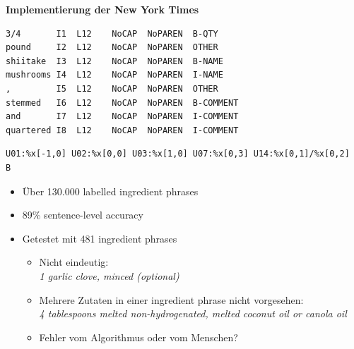 \documentclass[12pt]{beamer}
\begin{document}
\begin{frame}[fragile]
\begin{center}
		\textbf{Implementierung der New York Times}
\end{center}
\begin{lstlisting}[basicstyle=\small\ttfamily, frame=single, caption={Extract of the training data for New York Times CRF}]
3/4       I1  L12	 NoCAP	NoPAREN	 B-QTY
pound     I2  L12	 NoCAP	NoPAREN	 OTHER
shiitake  I3  L12	 NoCAP	NoPAREN	 B-NAME
mushrooms I4  L12	 NoCAP	NoPAREN	 I-NAME
,         I5  L12	 NoCAP	NoPAREN	 OTHER
stemmed   I6  L12	 NoCAP	NoPAREN	 B-COMMENT
and       I7  L12	 NoCAP	NoPAREN	 I-COMMENT
quartered I8  L12	 NoCAP	NoPAREN	 I-COMMENT
\end{lstlisting}
\begin{lstlisting}[basicstyle=\small\ttfamily, frame=single, caption={Feature templates}]
U01:%x[-1,0] U02:%x[0,0] U03:%x[1,0] U07:%x[0,3] U14:%x[0,1]/%x[0,2]
B
\end{lstlisting}
\end{frame}

\begin{frame}
	\begin{itemize}
		\item Über 130.000 labelled ingredient phrases
		\item 89\% sentence-level accuracy
		\item Getestet mit 481 ingredient phrases
		\begin{itemize}
			\item Nicht eindeutig: \\
			\textit{1 garlic clove, minced (optional)}
			\item Mehrere Zutaten in einer ingredient phrase nicht vorgesehen: \\
			\textit{4 tablespoons melted non-hydrogenated, melted coconut oil or canola oil}
			\item Fehler vom Algorithmus oder vom Menschen?
		\end{itemize}
	\end{itemize}
\end{frame}
\end{document}
